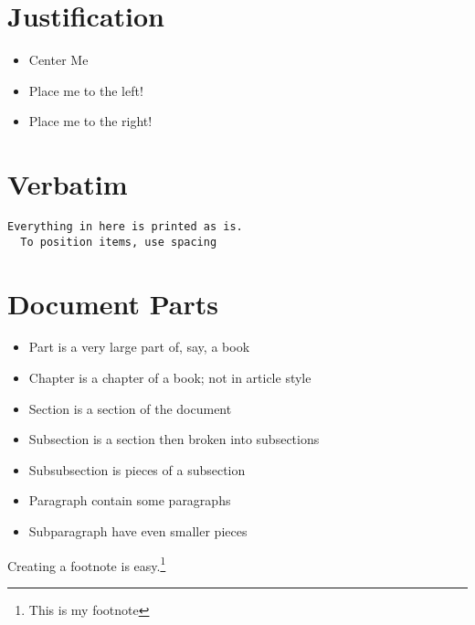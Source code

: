 \documentclass[11pt]{article}  %
\begin{document}
\section*{Justification}
\begin{itemize}
\item \begin{center} Center Me \end{center}  %
\item \begin{flushleft} Place me to the left! \end{flushleft}  %
\item \begin{flushright} Place me to the right! \end{flushright}  %

\end{itemize}

\section*{Verbatim}
\begin{verbatim}
Everything in here is printed as is.
  To position items, use spacing
\end{verbatim}

\section*{Document Parts}
\begin{itemize}
\item Part is a very large part of, say, a book
\item Chapter is a chapter of a book; not in article style
\item Section is a section of the document
\item Subsection is a section then broken into subsections
\item Subsubsection is pieces of a subsection
\item Paragraph contain some paragraphs
\item Subparagraph have even smaller pieces
\end{itemize}


Creating a footnote is easy.\footnote{This is my footnote}
\end{document}
